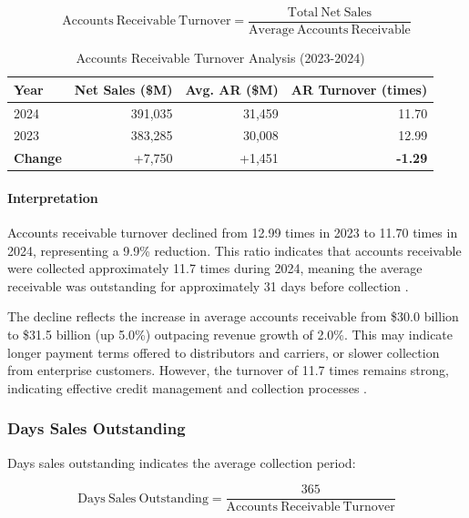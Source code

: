 \documentclass[12pt,a4paper]{article}
\begin{document}
\begin{equation}
\mathrm{Accounts\ Receivable\ Turnover} = \frac{\mathrm{Total\ Net\ Sales}}{\mathrm{Average\ Accounts\ Receivable}}
\end{equation}

\begin{table}[H]
\centering
\caption{Accounts Receivable Turnover Analysis (2023-2024)}
\label{tab:ar_turnover}
\begin{tabular}{lrrr}
\toprule
\textbf{Year} & \textbf{Net Sales (\$M)} & \textbf{Avg. AR (\$M)} & \textbf{AR Turnover (times)} \\
\midrule
2024 & 391,035 & 31,459 & 11.70 \\
2023 & 383,285 & 30,008 & 12.99 \\
\textbf{Change} & +7,750 & +1,451 & \textbf{-1.29} \\
\bottomrule
\end{tabular}
\end{table}

\paragraph{Interpretation}

Accounts receivable turnover declined from 12.99 times in 2023 to 11.70 times in 2024, representing a 9.9\% reduction. This ratio indicates that accounts receivable were collected approximately 11.7 times during 2024, meaning the average receivable was outstanding for approximately 31 days before collection \citep{apple202410k}.

The decline reflects the increase in average accounts receivable from \$30.0 billion to \$31.5 billion (up 5.0\%) outpacing revenue growth of 2.0\%. This may indicate longer payment terms offered to distributors and carriers, or slower collection from enterprise customers. However, the turnover of 11.7 times remains strong, indicating effective credit management and collection processes \citep{kieso2023}.

\subsubsection{Days Sales Outstanding}

Days sales outstanding indicates the average collection period:

\begin{equation}
\mathrm{Days\ Sales\ Outstanding} = \frac{365}{\mathrm{Accounts\ Receivable\ Turnover}}
\end{equation}
\end{document}
